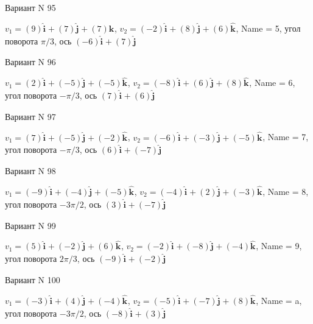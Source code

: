\documentclass[11pt]{report}
\begin{document}
Вариант N 95

$v_1 = \left(9\right)\mathbf{\hat{i}_{}} + \left(7\right)\mathbf{\hat{j}_{}} + \left(7\right)\mathbf{\hat{k}_{}}$, $v_2 = \left(-2\right)\mathbf{\hat{i}_{}} + \left(8\right)\mathbf{\hat{j}_{}} + \left(6\right)\mathbf{\hat{k}_{}}$, Name = 5, угол поворота $\pi / 3$, ось $\left(-6\right)\mathbf{\hat{i}_{}} + \left(7\right)\mathbf{\hat{j}_{}}$

Вариант N 96

$v_1 = \left(2\right)\mathbf{\hat{i}_{}} + \left(-5\right)\mathbf{\hat{j}_{}} + \left(-5\right)\mathbf{\hat{k}_{}}$, $v_2 = \left(-8\right)\mathbf{\hat{i}_{}} + \left(6\right)\mathbf{\hat{j}_{}} + \left(8\right)\mathbf{\hat{k}_{}}$, Name = 6, угол поворота $- \pi / 3$, ось $\left(7\right)\mathbf{\hat{i}_{}} + \left(6\right)\mathbf{\hat{j}_{}}$

Вариант N 97

$v_1 = \left(7\right)\mathbf{\hat{i}_{}} + \left(-5\right)\mathbf{\hat{j}_{}} + \left(-2\right)\mathbf{\hat{k}_{}}$, $v_2 = \left(-6\right)\mathbf{\hat{i}_{}} + \left(-3\right)\mathbf{\hat{j}_{}} + \left(-5\right)\mathbf{\hat{k}_{}}$, Name = 7, угол поворота $- \pi / 3$, ось $\left(6\right)\mathbf{\hat{i}_{}} + \left(-7\right)\mathbf{\hat{j}_{}}$

Вариант N 98

$v_1 = \left(-9\right)\mathbf{\hat{i}_{}} + \left(-4\right)\mathbf{\hat{j}_{}} + \left(-5\right)\mathbf{\hat{k}_{}}$, $v_2 = \left(-4\right)\mathbf{\hat{i}_{}} + \left(2\right)\mathbf{\hat{j}_{}} + \left(-3\right)\mathbf{\hat{k}_{}}$, Name = 8, угол поворота $- 3 \pi / 2$, ось $\left(3\right)\mathbf{\hat{i}_{}} + \left(-7\right)\mathbf{\hat{j}_{}}$

Вариант N 99

$v_1 = \left(5\right)\mathbf{\hat{i}_{}} + \left(-2\right)\mathbf{\hat{j}_{}} + \left(6\right)\mathbf{\hat{k}_{}}$, $v_2 = \left(-2\right)\mathbf{\hat{i}_{}} + \left(-8\right)\mathbf{\hat{j}_{}} + \left(-4\right)\mathbf{\hat{k}_{}}$, Name = 9, угол поворота $2 \pi / 3$, ось $\left(-9\right)\mathbf{\hat{i}_{}} + \left(-2\right)\mathbf{\hat{j}_{}}$

Вариант N 100

$v_1 = \left(-3\right)\mathbf{\hat{i}_{}} + \left(4\right)\mathbf{\hat{j}_{}} + \left(-4\right)\mathbf{\hat{k}_{}}$, $v_2 = \left(-5\right)\mathbf{\hat{i}_{}} + \left(-7\right)\mathbf{\hat{j}_{}} + \left(8\right)\mathbf{\hat{k}_{}}$, Name = a, угол поворота $- 3 \pi / 2$, ось $\left(-8\right)\mathbf{\hat{i}_{}} + \left(3\right)\mathbf{\hat{j}_{}}$
\end{document}
